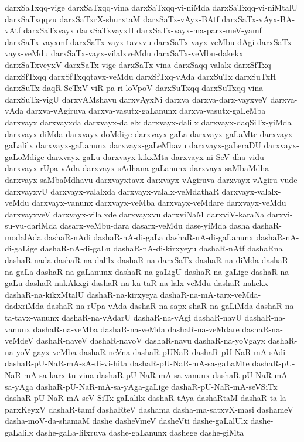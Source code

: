 {darxSaTxqq-vige
darxSaTxqq-vina
darxSaTxqq-vi-niMda
darxSaTxqq-vi-niMtalU
darxSaTxqqvu
darxSaTxrX-shurxtaM
darxSaTx-vAyx-BAtf
darxSaTx-vAyx-BA-vAtf
darxSaTxvayx
darxSaTxvayxH
darxSaTx-vayx-ma-parx-meV-yamf
darxSaTx-vayxmf
darxSaTx-vayx-tavxvu
darxSaTx-vayx-veMbu-dAgi
darxSaTx-vayx-veMdu
darxSaTx-vayx-vilalxveMdu
darxSaTx-veMbu-dakekx
darxSaTxveyxV
darxSaTx-vige
darxSaTx-vina
darxSaqq-valalx
darxSfTxq
darxSfTxqq
darxSfTxqqtavx-veMdu
darxSfTxq-vAda
darxSuTx
darxSuTxH
darxSuTx-daqR-SeTxV-viR-pa-ri-loVpoV
darxSuTxqq
darxSuTxqq-vina
darxSuTx-vigU
darxvAMshavu
darxvAyxNi
darxva
darxva-darx-vayxveV
darxva-vAda
darxva-vAgiruva
darxva-vasutx-gaLanunx
darxva-vasutx-gaLeMba
darxvayx
darxvayxda
darxvayx-dalelx
darxvayx-dalilx
darxvayx-daqSiTx-yiMda
darxvayx-diMda
darxvayx-doMdige
darxvayx-gaLa
darxvayx-gaLaMte
darxvayx-gaLalilx
darxvayx-gaLanunx
darxvayx-gaLeMbavu
darxvayx-gaLeraDU
darxvayx-gaLoMdige
darxvayx-gaLu
darxvayx-kikxMta
darxvayx-ni-SeV-dha-vidu
darxvayx-rUpa-vAda
darxvayx-sAdhana-gaLanunx
darxvayx-saMbaMdha
darxvayx-saMbaMdhavu
darxvayxtavx
darxvayx-vAgiruva
darxvayx-vAgiru-vude
darxvayxvU
darxvayx-valalxda
darxvayx-valalx-veMdathaR
darxvayx-valalx-veMdu
darxvayx-vanunx
darxvayx-veMba
darxvayx-veMdare
darxvayx-veMdu
darxvayxveV
darxvayx-vilalxde
darxvayxvu
darxviNaM
darxviV-karaNa
darxvi-su-vu-dariMda
dasarx-veMbu-dara
dasarx-veMdu
dase-yiMda
dasha
dashaR-modalAda
dashaR-nAdi
dashaR-nA-di-gaLa
dashaR-nA-di-gaLanunx
dashaR-nA-di-gaLige
dashaR-nA-di-gaLu
dashaR-nA-di-kirxyeyu
dashaR-nAtf
dashaRna
dashaR-nada
dashaR-na-dalilx
dashaR-na-darxSaTx
dashaR-na-diMda
dashaR-na-gaLa
dashaR-na-gaLanunx
dashaR-na-gaLigU
dashaR-na-gaLige
dashaR-na-gaLu
dashaR-nakAkxgi
dashaR-na-ka-taR-na-lalx-veMdu
dashaR-nakekx
dashaR-na-kikxMtalU
dashaR-na-kirxyeya
dashaR-na-mA-tarx-veMda-dadxriMda
dashaR-na-rUpa-vAda
dashaR-na-sapx-shaR-na-gaLiMda
dashaR-na-ta-tavx-vanunx
dashaR-na-vAdarU
dashaR-na-vAgi
dashaR-navU
dashaR-na-vanunx
dashaR-na-veMba
dashaR-na-veMda
dashaR-na-veMdare
dashaR-na-veMdeV
dashaR-naveV
dashaR-navoV
dashaR-navu
dashaR-na-yoVgayx
dashaR-na-yoV-gayx-veMba
dashaR-neVna
dashaR-pUNaR
dashaR-pU-NaR-mA-sAdi
dashaR-pU-NaR-mA-sA-di-vi-hita
dashaR-pU-NaR-mA-sa-gaLaMte
dashaR-pU-NaR-mA-sa-karx-tu-vina
dashaR-pU-NaR-mA-sa-vanunx
dashaR-pU-NaR-mA-sa-yAga
dashaR-pU-NaR-mA-sa-yAga-gaLige
dashaR-pU-NaR-mA-seVSiTx
dashaR-pU-NaR-mA-seV-SiTx-gaLalilx
dashaR-tAya
dashaRtaM
dashaR-ta-la-parxKeyxV
dashaR-tamf
dashaRteV
dashama
dasha-ma-satxvX-masi
dashameV
dasha-moV-da-shamaM
dashe
dasheVmeV
dasheVti
dashe-gaLalUlx
dashe-gaLalilx
dashe-gaLa-lilxruva
dashe-gaLanunx
dashege
dashe-giMta
}
